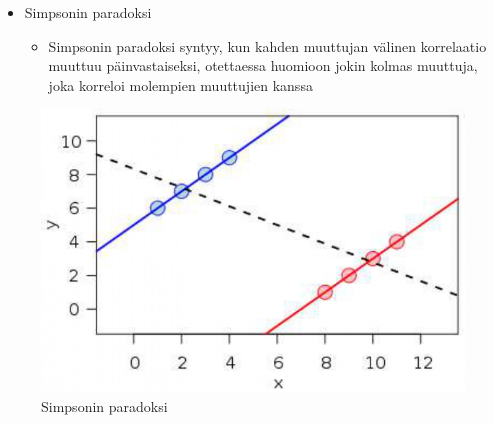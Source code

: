 \documentclass[
]{book}
\providecommand{\tightlist}{%
  \setlength{\itemsep}{0pt}\setlength{\parskip}{0pt}}
\begin{document}
\begin{itemize}
\tightlist
\item
  Simpsonin paradoksi

  \begin{itemize}
  \tightlist
  \item
    Simpsonin paradoksi syntyy, kun kahden muuttujan välinen korrelaatio muuttuu päinvastaiseksi, otettaessa huomioon jokin kolmas muuttuja, joka korreloi molempien muuttujien kanssa
  \end{itemize}
\end{itemize}

\FloatBarrier

\begin{figure}

{\centering \includegraphics[width=0.75\linewidth]{images/simpson} 

}

\caption{Simpsonin paradoksi}\label{fig:simpson}
\end{figure}

\FloatBarrier

\newpage
\end{document}

